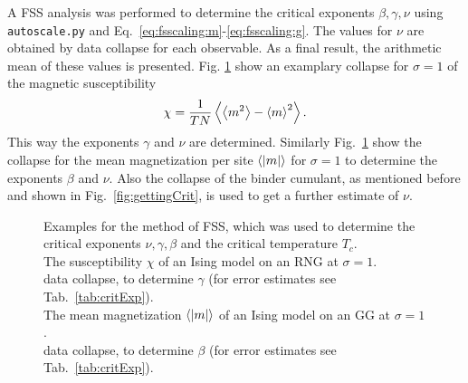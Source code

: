     A FSS analysis was
    performed to determine the critical exponents \(\beta, \gamma, \nu\)
    using \texttt{autoscale.py} \cite{autoscale2009} and Eq.\ \eqref{eq:fsscaling:m}-\eqref{eq:fsscaling:g}.
    The values for \(\nu\) are obtained by data collapse for each observable.
    As a final result, the arithmetic mean of these values is presented.
    Fig. \ref{fig:gettingCrit2}
    show an examplary collapse for \(\sigma=1\) of the magnetic susceptibility
    \begin{equation}
        \chi = \frac{1}{TN}\left< \left< m^2 \right> - \left< m \right>^2 \right>.
    \end{equation}
    This way the exponents \(\gamma\) and \(\nu\) are determined.
    Similarly Fig.\ \ref{fig:gettingCrit2}
    show the collapse for the mean magnetization per site \(\left< \left\vert m\right\vert \right>\) for \(\sigma=1\)
    to determine the exponents \(\beta\) and \(\nu\).
    Also the collapse of the binder cumulant, as mentioned before and shown
    in Fig.\ \ref{fig:gettingCrit},
    is used to get a further estimate of \(\nu\).
    \begin{figure}[htbp]
        \centering
        \caption[Examples of Determining Critical Temperature and Exponents]
        {
            Examples for the method of FSS, which was used
            to determine the critical exponents \(\nu, \gamma, \beta\) and
            the critical temperature \(T_c\).\\
             The susceptibility \(\chi\)
                of an Ising model on an RNG at \(\sigma=1\).\\
             data collapse, to determine \(\gamma\) (for error estimates see Tab.\ \ref{tab:critExp}).\\
             The mean magnetization \(\left< \left\vert m\right\vert \right>\)
                of an Ising model on an GG at \(\sigma=1\).\\
             data collapse, to determine \(\beta\) (for error estimates see Tab.\ \ref{tab:critExp}).
        }
        \label{fig:gettingCrit2}
    \end{figure}\\
